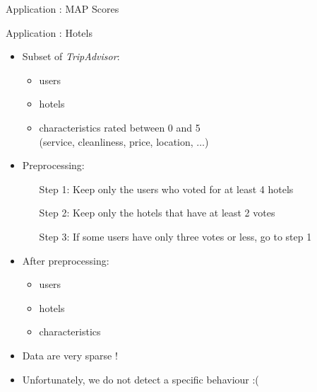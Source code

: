 \begin{frame}{Application : MAP Scores}

\end{frame}

\begin{frame}{Application : Hotels}
\begin{itemize}
    \item Subset of \textit{TripAdvisor}:
    \begin{itemize}
        \item {} users
        \item {} hotels
        \item {} characteristics rated between 0 and 5\\ (service, cleanliness, price, location, $\dots$)
    \end{itemize}
    \item Preprocessing:
    \begin{itemize}
        \item[Step 1:] Keep only the users who voted for at least 4 hotels
        \item[Step 2:] Keep only the hotels that have at least 2 votes
        \item[Step 3:] If some users have only three votes or less, go to step 1
    \end{itemize}
    \item After preprocessing:
    \begin{itemize}
        \item {} users
        \item {} hotels
        \item {} characteristics
    \end{itemize}
    \item Data are very sparse !
    \item Unfortunately, we do not detect a specific behaviour :(
\end{itemize}
\end{frame}

